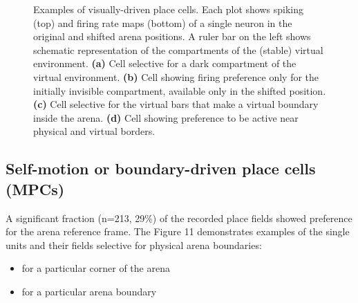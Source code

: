 \begin{figure}
\captionsetup{format=plain}
\caption[Visually-driven place cells]{
Examples of visually-driven place cells. Each plot shows spiking (top) and firing rate maps (bottom) of a single neuron in the original and shifted arena positions. A ruler bar on the left shows schematic representation of the compartments of the (stable) virtual environment. \textbf{(a)} Cell selective for a dark compartment of the virtual environment. \textbf{(b)} Cell showing firing preference only for the initially invisible compartment, available only in the shifted position. \textbf{(c)} Cell selective for the virtual bars that make a virtual boundary inside the arena. \textbf{(d)} Cell showing preference to be active near physical and virtual borders.
}
\label{fig:F10_VPCs}
\end{figure}


\subsection{Self-motion or boundary-driven place cells (MPCs)}

A significant fraction (n=213, 29\%) of the recorded place fields showed preference for the arena reference frame. The Figure 11 demonstrates examples of the single units and their fields selective for physical arena boundaries:
\begin{itemize}
  \item for a particular corner of the arena
  \item for a particular arena boundary
\end{itemize}


